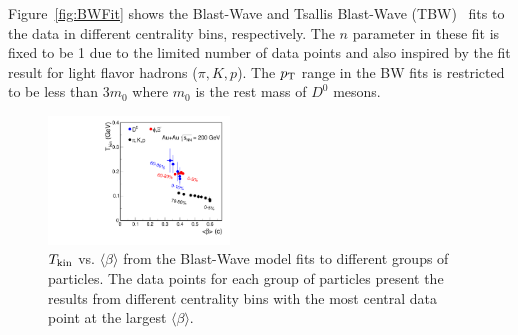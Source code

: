 \documentclass[%
 reprint,	
 amsmath,amssymb,
 aps,
 prc,
]{revtex4-1}
\begin{document}
%

Figure~\ref{fig:BWFit} shows the Blast-Wave and Tsallis Blast-Wave (TBW)~\cite{Tang:2008ud} fits to the data in different centrality bins, respectively. The $n$ parameter in these fit is fixed to be 1 due to the limited number of data points and also inspired by the fit result for light flavor hadrons ($\pi,K,p$). The $p_{\rm T}$ range in the BW fits is restricted to be less than 3$m_{0}$ where $m_{0}$ is the rest mass of $D^0$ mesons.

\begin{figure}
\centering
\includegraphics[width=0.43\textwidth]{fig/TvsBeta.pdf}
\caption{$T_{\rm kin}$ vs. $\langle\beta\rangle$ from the Blast-Wave model fits to different groups of particles. The data points for each group of particles present the results from different centrality bins with the most central data point at the largest $\langle\beta\rangle$.}
\label{fig:BWFitSummary} 
\end{figure}
\end{document}
